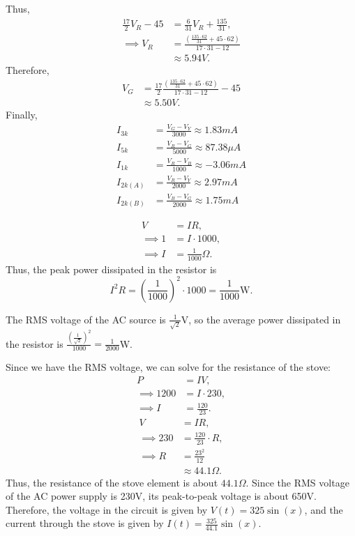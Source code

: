 \documentclass{article}
\begin{document}
Thus,
\begin{align*}
    \frac{17}2V_R - 45 &= \frac{6}{31}V_R+\frac{135}{31}, \\
    \implies V_R       &= \frac{\left(\frac{135\cdot62}{31}+45\cdot62\right)}{17\cdot31-12} \\
                       &\approx 5.94V.
\end{align*}
Therefore,
\begin{align*}
    V_G &= \frac{17}2\frac{\left(\frac{135\cdot62}{31}+45\cdot62\right)}{17\cdot31-12} - 45 \\
        &\approx 5.50V.
\end{align*}
Finally,
\begin{align*}
    I_{3k}    &= \frac{V_G - V_Y}{3000} \approx 1.83mA \\
    I_{5k}    &= \frac{V_R - V_G}{5000} \approx 87.38\mu A \\
    I_{1k}    &= \frac{V_R - V_B}{1000} \approx -3.06mA \\
    I_{2k(A)} &= \frac{V_R - V_Y}{2000} \approx 2.97mA \\
    I_{2k(B)} &= \frac{V_B - V_G}{2000} \approx 1.75mA
\end{align*}

\newpage{}
\begin{align*}
    V &= IR, \\
    \implies 1 &= I \cdot 1000, \\
    \implies I &= \frac1{1000}\Omega.
\end{align*}
Thus, the peak power dissipated in the resistor is $$I^2R = \left(\frac1{1000}\right)^2 \cdot 1000 = \frac{1}{1000}\text{W}.$$

The RMS voltage of the AC source is $\frac1{\sqrt{2}}$V, so the average power dissipated in the resistor is $\frac{\left(\frac1{\sqrt2}\right)^2}{1000} = \frac1{2000}$W.

\newpage{}

Since we have the RMS voltage, we can solve for the resistance of the stove:
\begin{align*}
         P    &= IV, \\
\implies 1200 &= I \cdot 230, \\
\implies I    &= \frac{120}{23}.
\end{align*}
\begin{align*}
         V &= IR, \\
\implies 230 &= \frac{120}{23} \cdot R, \\
\implies R   &= \frac{23^2}{12} \\
             &\approx 44.1\Omega.
\end{align*}
Thus, the resistance of the stove element is about $44.1\Omega$.
Since the RMS voltage of the AC power supply is 230V, its peak-to-peak voltage is about 650V.
Therefore, the voltage in the circuit is given by $V(t) = 325\sin(x)$, and the current through the stove is given by $I(t) = \frac{325}{44.1}\sin(x)$.
\end{document}
